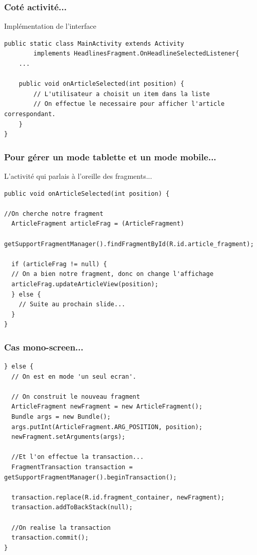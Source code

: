 \documentclass{beamer}
\begin{document}
\begin{frame}[fragile]
\frametitle{Coté activité...}
\begin{block}{Implémentation de l'interface}
\begin{lstlisting}
public static class MainActivity extends Activity
        implements HeadlinesFragment.OnHeadlineSelectedListener{
    ...
    
    public void onArticleSelected(int position) {
        // L'utilisateur a choisit un item dans la liste
        // On effectue le necessaire pour afficher l'article correspondant.
    }
}
\end{lstlisting}

\end{block}
\end{frame}

\begin{frame}[fragile]
\frametitle{Pour gérer un mode tablette et un mode mobile...}
\begin{block}{L'activité qui parlais à l'oreille des fragments...}
\begin{lstlisting}
public void onArticleSelected(int position) {

//On cherche notre fragment
  ArticleFragment articleFrag = (ArticleFragment)
    getSupportFragmentManager().findFragmentById(R.id.article_fragment);

  if (articleFrag != null) {
  // On a bien notre fragment, donc on change l'affichage
  articleFrag.updateArticleView(position);
  } else {
    // Suite au prochain slide...
  }
}
\end{lstlisting}
\end{block}
\end{frame}

\begin{frame}[fragile]
\frametitle{Cas mono-screen...}
\begin{lstlisting}
} else {
  // On est en mode 'un seul ecran'.

  // On construit le nouveau fragment
  ArticleFragment newFragment = new ArticleFragment();
  Bundle args = new Bundle();
  args.putInt(ArticleFragment.ARG_POSITION, position);
  newFragment.setArguments(args);

  //Et l'on effectue la transaction...
  FragmentTransaction transaction = getSupportFragmentManager().beginTransaction();

  transaction.replace(R.id.fragment_container, newFragment);
  transaction.addToBackStack(null);

  //On realise la transaction
  transaction.commit();
}
\end{lstlisting}
\end{frame}
    
\end{document}
